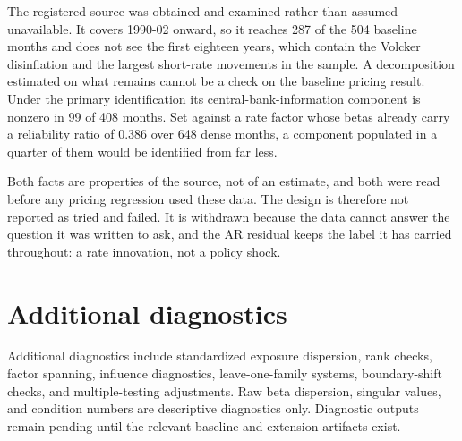 \documentclass[11pt]{article}
\begin{document}
The registered source was obtained and examined rather than assumed unavailable.
It covers 1990-02 onward, so it reaches 287 of the 504 baseline months and does %
not see the first eighteen years, which contain the Volcker disinflation and the %
largest short-rate movements in the sample. A decomposition estimated on what
remains cannot be a check on the baseline pricing result. Under the primary
identification its central-bank-information component is nonzero in 99 of 408 %
months. Set against a rate factor whose betas already carry a reliability ratio %
of 0.386 over 648 dense months, a component populated in a quarter of them would %
be identified from far less.

Both facts are properties of the source, not of an estimate, and both were read
before any pricing regression used these data. The design is therefore not
reported as tried and failed. It is withdrawn because the data cannot answer the
question it was written to ask, and the AR residual keeps the label it has
carried throughout: a rate innovation, not a policy shock. %

\section{Additional diagnostics}

Additional diagnostics include standardized exposure dispersion, rank checks,
factor spanning, influence diagnostics, leave-one-family systems, boundary-shift
checks, and multiple-testing adjustments. Raw beta dispersion, singular values,
and condition numbers are descriptive diagnostics only. Diagnostic outputs
remain pending until the relevant baseline and extension artifacts exist.



\end{document}
